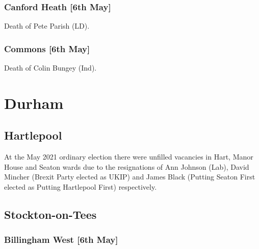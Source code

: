\documentclass[a4paper,openany]{book}
\begin{document}
\begin{resultsiii}
\subsubsection*{Canford Heath \hspace*{\fill}\nolinebreak[1]%
	\enspace\hspace*{\fill}
	[6th May]}


Death of Pete Parish (LD).

\subsubsection*{Commons \hspace*{\fill}\nolinebreak[1]%
	\enspace\hspace*{\fill}
	[6th May]}


Death of Colin Bungey (Ind).

\section{Durham}

\subsection*{Hartlepool}

At the May 2021 ordinary election there were unfilled vacancies in Hart, Manor House and Seaton wards due to the resignations of Ann Johnson (Lab), David Mincher (Brexit Party elected as UKIP) and James Black (Putting Seaton First elected as Putting Hartlepool First) respectively.

\subsection*{Stockton-on-Tees}

\subsubsection*{Billingham West \hspace*{\fill}\nolinebreak[1]%
	\enspace\hspace*{\fill}
	[6th May]}


\end{resultsiii}
\end{document}
